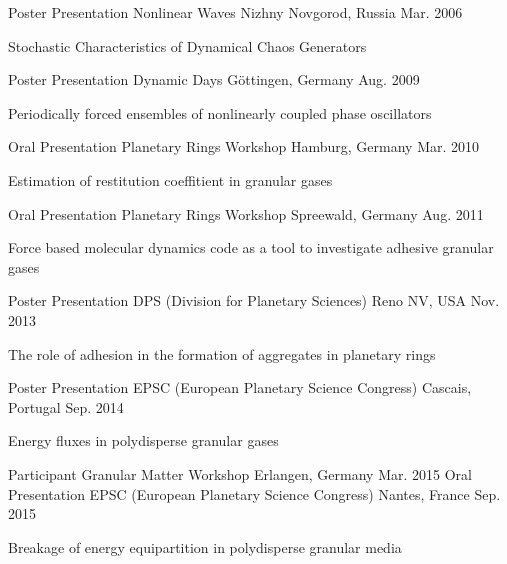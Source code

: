 \begin{cventries}
  \cventry
    {Poster Presentation}
    {Nonlinear Waves}
    {Nizhny Novgorod, Russia}
    {Mar. 2006}
    {
      \begin{cvitems}
        \item {Stochastic Characteristics of Dynamical Chaos Generators}
      \end{cvitems}
    }
  \cventry
    {Poster Presentation}
    {Dynamic Days}
    {G\"ottingen, Germany}
    {Aug. 2009}
    {
      \begin{cvitems}
        \item {Periodically forced ensembles of nonlinearly coupled phase oscillators}
      \end{cvitems}
    }
  \cventry
    {Oral Presentation}
    {Planetary Rings Workshop}
    {Hamburg, Germany}
    {Mar. 2010}
    {
      \begin{cvitems}
        \item {Estimation of restitution coeffitient in granular gases}
      \end{cvitems}
    }
  \cventry
    {Oral Presentation}
    {Planetary Rings Workshop}
    {Spreewald, Germany}
    {Aug. 2011}
    {
      \begin{cvitems}
        \item {Force based molecular dynamics code as a tool to investigate adhesive granular gases}
      \end{cvitems}
    }
  \cventry
    {Poster Presentation}
    {DPS (Division for Planetary Sciences)}
    {Reno NV, USA}
    {Nov. 2013}
    {
      \begin{cvitems}
        \item {The role of adhesion in the formation of aggregates in planetary rings}
      \end{cvitems}
    }
  \cventry
    {Poster Presentation}
    {EPSC (European Planetary Science Congress)}
    {Cascais, Portugal}
    {Sep. 2014}
    {
      \begin{cvitems}
        \item {Energy fluxes in polydisperse granular gases}
      \end{cvitems}
    }
  \cventry
    {Participant}
    {Granular Matter Workshop}
    {Erlangen, Germany}
    {Mar. 2015}
    {}
  \cventry
    {Oral Presentation}
    {EPSC (European Planetary Science Congress)}
    {Nantes, France}
    {Sep. 2015}
    {
      \begin{cvitems}
        \item {Breakage of energy equipartition in polydisperse granular media}
      \end{cvitems}
    }
\end{cventries}

